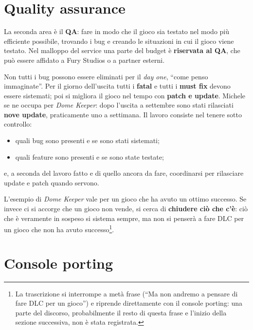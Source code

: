 \section{Quality assurance}
\label{sec:z4-qa}

La seconda area è il \textbf{QA}: fare in modo che il gioco sia testato nel modo
più efficiente possibile, trovando i bug e creando le situazioni in cui il
gioco viene testato. Nel malloppo del service una parte del budget è
\textbf{riservata al QA}, che può essere affidato a Fury Studios o a partner
esterni.

Non tutti i bug possono essere eliminati per il \emph{day one}, ``come penso
immaginate''. Per il giorno dell'uscita tutti i \textbf{fatal} e tutti i
\textbf{must fix} devono essere sistemati; poi si migliora il gioco nel tempo
con \textbf{patch e update}. Michele se ne occupa per \emph{Dome Keeper}: dopo
l'uscita a settembre sono stati rilasciati \textbf{nove update}, praticamente
uno a settimana. Il lavoro consiste nel tenere sotto controllo:
\begin{itemize}
  \item quali bug sono presenti e se sono stati sistemati;
  \item quali feature sono presenti e se sono state testate;
\end{itemize}
e, a seconda del lavoro fatto e di quello ancora da fare, coordinarsi per
rilasciare update e patch quando servono.

L'esempio di \emph{Dome Keeper} vale per un gioco che ha avuto un ottimo
successo. Se invece ci si accorge che un gioco non vende, si cerca di
\textbf{chiudere ciò che c'è}: ciò che è veramente in sospeso si sistema sempre,
ma non si penserà a fare DLC per un gioco che non ha avuto successo\footnote{La
trascrizione si interrompe a metà frase (``Ma non andremo a pensare di fare DLC
per un gioco'') e riprende direttamente con il console porting: una parte del
discorso, probabilmente il resto di questa frase e l'inizio della sezione
successiva, non è stata registrata.}.

\section{Console porting}
\label{sec:z4-porting}

